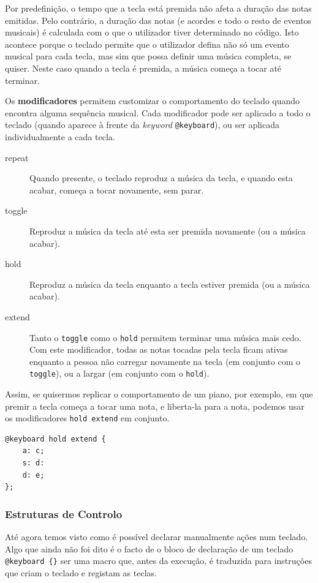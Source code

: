 Por predefinição, o tempo que a tecla está premida não afeta a duração das notas emitidas. Pelo contrário, a duração das notas (e acordes e todo o resto de eventos musicais) é calculada com o que o utilizador tiver determinado no código. Isto acontece porque o teclado permite que o utilizador defina não só um evento musical para cada tecla, mas sim que possa definir uma música completa, se quiser. Neste caso quando a tecla é premida, a música começa a tocar até terminar.

Os \textbf{modificadores} permitem customizar o comportamento do teclado quando encontra alguma sequência musical. Cada modificador pode ser aplicado a todo o teclado (quando aparece à frente da \textit{keyword} \texttt{@keyboard}), ou ser aplicada individualmente a cada tecla.

\begin{description}
 \item[repeat] Quando presente, o teclado reproduz a música da tecla, e quando esta acabar, começa a tocar novamente, sem parar.
 \item[toggle] Reproduz a música da tecla até esta ser premida novamente (ou a música acabar).
 \item[hold] Reproduz a música da tecla enquanto a tecla estiver premida (ou a música acabar).
 \item[extend] Tanto o \texttt{toggle} como o \texttt{hold} permitem terminar uma música mais cedo. Com este modificador, todas as notas tocadas pela tecla ficam ativas enquanto a pessoa não carregar novamente na tecla (em conjunto com o \texttt{toggle}), ou a largar (em conjunto com o \texttt{hold}).
\end{description}

Assim, se quisermos replicar o comportamento de um piano, por exemplo, em que premir a tecla começa a tocar uma nota, e liberta-la para a nota, podemos usar os modificadores \texttt{hold extend} em conjunto.

\begin{lstlisting}[caption={Aplicar o modificador \texttt{hold extend} a um teclado inteiro}]
@keyboard hold extend {
    a: c;
    s: d:
    d: e;
};
\end{lstlisting}

\subsubsection{Estruturas de Controlo}
Até agora temos visto como é possível declarar manualmente ações num teclado. Algo que ainda não foi dito é o facto de o bloco de declaração de um teclado \verb|@keyboard {}| ser uma macro que, antes da execução, é traduzida para instruções que criam o teclado e registam as teclas.


